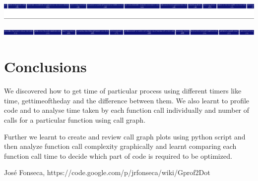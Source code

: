 \documentclass[11pt]{article}
\begin{document}
\begin{center}
 \includegraphics[scale = 0.35]{images/rls2} \\
\end{center}

\begin{center}
 \includegraphics[scale = 0.35]{images/rls3} \\
\end{center}


\section{Conclusions}
\paragraph{}
	We discovered how to get time of particular process using different timers like time, gettimeoftheday and the 
	difference between them. We also learnt to profile code and to analyse time taken by each function call individually and number of calls 
	for a particular function using call graph.

	Further we learnt to create and review call graph plots using python script and then analyze function call complexity graphically
 and learnt comparing each function call time to decide which part of code is required to be optimized.
	
\begin{thebibliography}{1}

 José Fonseca, https://code.google.com/p/jrfonseca/wiki/Gprof2Dot
 
\end{thebibliography}
\end{document}
